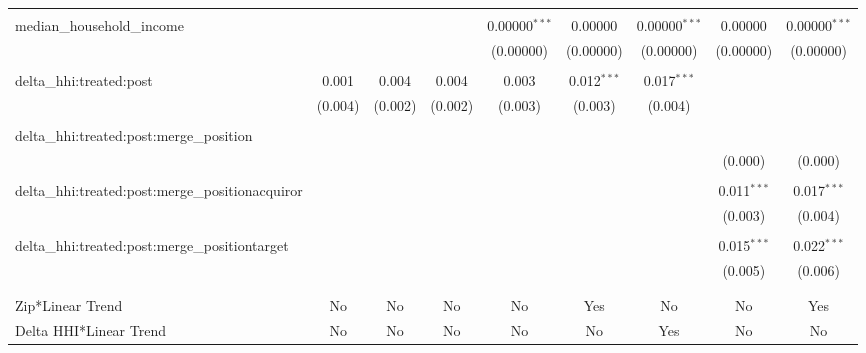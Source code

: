 \begin{table}[H]
{\begin{tabular}{@{\extracolsep{5pt}}lcccccccc}
   & & & & & & & & \\  

  median\_household\_income &  &  &  & 0.00000$^{***}$ & 0.00000 & 0.00000$^{***}$ & 0.00000 & 0.00000$^{***}$ \\  

   &  &  &  & (0.00000) & (0.00000) & (0.00000) & (0.00000) & (0.00000) \\  

   & & & & & & & & \\  

  delta\_hhi:treated:post & 0.001 & 0.004 & 0.004 & 0.003 & 0.012$^{***}$ & 0.017$^{***}$ &  &  \\  

   & (0.004) & (0.002) & (0.002) & (0.003) & (0.003) & (0.004) &  &  \\  

   & & & & & & & & \\  

  delta\_hhi:treated:post:merge\_position &  &  &  &  &  &  &  &  \\  

   &  &  &  &  &  &  & (0.000) & (0.000) \\  

   & & & & & & & & \\  

  delta\_hhi:treated:post:merge\_positionacquiror &  &  &  &  &  &  & 0.011$^{***}$ & 0.017$^{***}$ \\  

   &  &  &  &  &  &  & (0.003) & (0.004) \\  

   & & & & & & & & \\  

  delta\_hhi:treated:post:merge\_positiontarget &  &  &  &  &  &  & 0.015$^{***}$ & 0.022$^{***}$ \\  

   &  &  &  &  &  &  & (0.005) & (0.006) \\  

   & & & & & & & & \\  

 \hline \\[-1.8ex]  

 Zip*Linear Trend & No & No & No & No & Yes & No & No & Yes \\  

 Delta HHI*Linear Trend & No & No & No & No & No & Yes & No & No \\  


\end{tabular}}
\end{table}
